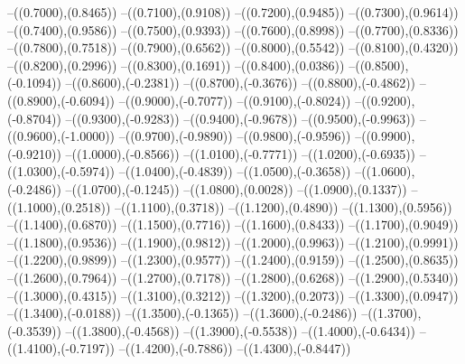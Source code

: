 {	--({\sx*(0.7000)},{\sy*(0.8465)})
	--({\sx*(0.7100)},{\sy*(0.9108)})
	--({\sx*(0.7200)},{\sy*(0.9485)})
	--({\sx*(0.7300)},{\sy*(0.9614)})
	--({\sx*(0.7400)},{\sy*(0.9586)})
	--({\sx*(0.7500)},{\sy*(0.9393)})
	--({\sx*(0.7600)},{\sy*(0.8998)})
	--({\sx*(0.7700)},{\sy*(0.8336)})
	--({\sx*(0.7800)},{\sy*(0.7518)})
	--({\sx*(0.7900)},{\sy*(0.6562)})
	--({\sx*(0.8000)},{\sy*(0.5542)})
	--({\sx*(0.8100)},{\sy*(0.4320)})
	--({\sx*(0.8200)},{\sy*(0.2996)})
	--({\sx*(0.8300)},{\sy*(0.1691)})
	--({\sx*(0.8400)},{\sy*(0.0386)})
	--({\sx*(0.8500)},{\sy*(-0.1094)})
	--({\sx*(0.8600)},{\sy*(-0.2381)})
	--({\sx*(0.8700)},{\sy*(-0.3676)})
	--({\sx*(0.8800)},{\sy*(-0.4862)})
	--({\sx*(0.8900)},{\sy*(-0.6094)})
	--({\sx*(0.9000)},{\sy*(-0.7077)})
	--({\sx*(0.9100)},{\sy*(-0.8024)})
	--({\sx*(0.9200)},{\sy*(-0.8704)})
	--({\sx*(0.9300)},{\sy*(-0.9283)})
	--({\sx*(0.9400)},{\sy*(-0.9678)})
	--({\sx*(0.9500)},{\sy*(-0.9963)})
	--({\sx*(0.9600)},{\sy*(-1.0000)})
	--({\sx*(0.9700)},{\sy*(-0.9890)})
	--({\sx*(0.9800)},{\sy*(-0.9596)})
	--({\sx*(0.9900)},{\sy*(-0.9210)})
	--({\sx*(1.0000)},{\sy*(-0.8566)})
	--({\sx*(1.0100)},{\sy*(-0.7771)})
	--({\sx*(1.0200)},{\sy*(-0.6935)})
	--({\sx*(1.0300)},{\sy*(-0.5974)})
	--({\sx*(1.0400)},{\sy*(-0.4839)})
	--({\sx*(1.0500)},{\sy*(-0.3658)})
	--({\sx*(1.0600)},{\sy*(-0.2486)})
	--({\sx*(1.0700)},{\sy*(-0.1245)})
	--({\sx*(1.0800)},{\sy*(0.0028)})
	--({\sx*(1.0900)},{\sy*(0.1337)})
	--({\sx*(1.1000)},{\sy*(0.2518)})
	--({\sx*(1.1100)},{\sy*(0.3718)})
	--({\sx*(1.1200)},{\sy*(0.4890)})
	--({\sx*(1.1300)},{\sy*(0.5956)})
	--({\sx*(1.1400)},{\sy*(0.6870)})
	--({\sx*(1.1500)},{\sy*(0.7716)})
	--({\sx*(1.1600)},{\sy*(0.8433)})
	--({\sx*(1.1700)},{\sy*(0.9049)})
	--({\sx*(1.1800)},{\sy*(0.9536)})
	--({\sx*(1.1900)},{\sy*(0.9812)})
	--({\sx*(1.2000)},{\sy*(0.9963)})
	--({\sx*(1.2100)},{\sy*(0.9991)})
	--({\sx*(1.2200)},{\sy*(0.9899)})
	--({\sx*(1.2300)},{\sy*(0.9577)})
	--({\sx*(1.2400)},{\sy*(0.9159)})
	--({\sx*(1.2500)},{\sy*(0.8635)})
	--({\sx*(1.2600)},{\sy*(0.7964)})
	--({\sx*(1.2700)},{\sy*(0.7178)})
	--({\sx*(1.2800)},{\sy*(0.6268)})
	--({\sx*(1.2900)},{\sy*(0.5340)})
	--({\sx*(1.3000)},{\sy*(0.4315)})
	--({\sx*(1.3100)},{\sy*(0.3212)})
	--({\sx*(1.3200)},{\sy*(0.2073)})
	--({\sx*(1.3300)},{\sy*(0.0947)})
	--({\sx*(1.3400)},{\sy*(-0.0188)})
	--({\sx*(1.3500)},{\sy*(-0.1365)})
	--({\sx*(1.3600)},{\sy*(-0.2486)})
	--({\sx*(1.3700)},{\sy*(-0.3539)})
	--({\sx*(1.3800)},{\sy*(-0.4568)})
	--({\sx*(1.3900)},{\sy*(-0.5538)})
	--({\sx*(1.4000)},{\sy*(-0.6434)})
	--({\sx*(1.4100)},{\sy*(-0.7197)})
	--({\sx*(1.4200)},{\sy*(-0.7886)})
	--({\sx*(1.4300)},{\sy*(-0.8447)})
}
